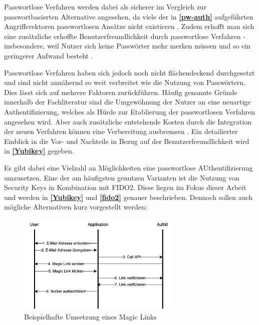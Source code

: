 Passwortlose Verfahren werden dabei als sicherer im Vergleich zur passwortbasierten Alternative angesehen, da viele der in \textbf{\ref{pw-auth}} aufgeführten Angriffsvektoren passwortlosen Ansätze nicht existieren \cite{chowhan2019password} \cite{parmar2022comprehensive}. Zudem erhofft man sich eine zusätzliche erhoffte Benutzerfreundlichkeit durch passwortlose Verfahren - insbesondere, weil Nutzer sich keine Passwörter mehr merken müssen und so ein geringerer Aufwand besteht \cite{chowhan2019password}.

Passwortlose Verfahren haben sich jedoch noch nicht flächendeckend durchgesetzt und sind nicht annähernd so weit verbreitet wie die Nutzung von Passwörtern. Dies lässt sich auf mehrere Faktoren zurückführen. Häufig genannte Gründe innerhalb der Fachliteratur sind die Umgewöhnung der Nutzer an eine neuartige Authentifizierung, welches als Hürde zur Etablierung der passwortlosen Verfahren angesehen wird. Aber auch zusätzliche entstehende Kosten durch die Integration der neuen Verfahren können eine Verbereitung ausbremsen \cite{chowhan2019password}. Ein detailierter Einblick in die Vor- und Nachteile in Bezug auf der Benutzerfreundlichkeit wird in \textbf{\ref{Yubikey}} gegeben.

Es gibt dabei eine Vielzahl an Möglichkeiten eine passwortlose AUthentifizierung umzusetzen. Eine der am häufigsten genutzen Varianten ist die Nutzung von Security Keys in Kombination mit FIDO2. Diese liegen im Fokus dieser Arbeit und werden in \textbf{\ref{Yubikey}} und \textbf{\ref{fido2}} genauer beschrieben. Dennoch sollen auch mögliche Alternativen kurz vorgestellt werden:


\begin{figure}[h]
	\centering 
	\includegraphics[width=0.7\textwidth]{img/abbildungen/magic_link.png}
	\captionsetup{format=hang}
	\caption{Beispielhafte Umsetzung eines Magic Links} \label{magiclink}
\end{figure}

